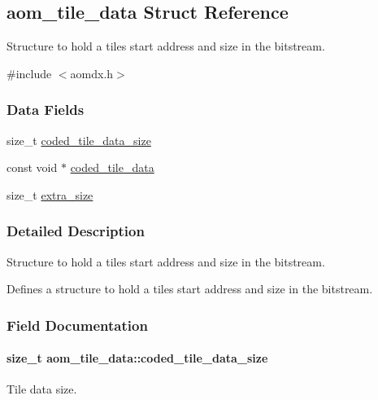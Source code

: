 \hypertarget{structaom__tile__data}{}\subsection{aom\+\_\+tile\+\_\+data Struct Reference}
\label{structaom__tile__data}


Structure to hold a tile\textquotesingle{}s start address and size in the bitstream.  




{\ttfamily \#include $<$aomdx.\+h$>$}

\subsubsection*{Data Fields}
\begin{DoxyCompactItemize}
\item 
size\+\_\+t \hyperlink{structaom__tile__data_a4451b0bcd81b4959484745df35a9fbba}{coded\+\_\+tile\+\_\+data\+\_\+size}
\item 
const void $\ast$ \hyperlink{structaom__tile__data_a05898249ddaf5ba799dd471113b0e51e}{coded\+\_\+tile\+\_\+data}
\item 
size\+\_\+t \hyperlink{structaom__tile__data_a936851e515bcea0af38d2d091f5adf65}{extra\+\_\+size}
\end{DoxyCompactItemize}


\subsubsection{Detailed Description}
Structure to hold a tile\textquotesingle{}s start address and size in the bitstream. 

Defines a structure to hold a tile\textquotesingle{}s start address and size in the bitstream. 

\subsubsection{Field Documentation}
\paragraph[{\texorpdfstring{coded\+\_\+tile\+\_\+data\+\_\+size}{coded_tile_data_size}}]{\setlength{\rightskip}{0pt plus 5cm}size\+\_\+t aom\+\_\+tile\+\_\+data\+::coded\+\_\+tile\+\_\+data\+\_\+size}\hypertarget{structaom__tile__data_a4451b0bcd81b4959484745df35a9fbba}{}\label{structaom__tile__data_a4451b0bcd81b4959484745df35a9fbba}
Tile data size. 
